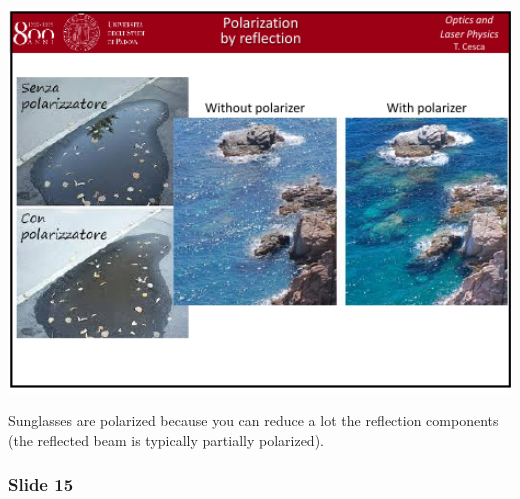 \documentclass[../main/main.tex]{subfiles}
\begin{document}
\begin{minipage}[]{0.5\linewidth}
\centering
\includegraphics[width=1\textwidth]{../lessons/pdf_file/02/02_S14.pdf}
\end{minipage}
\hspace{0.3cm}\vspace{0.3cm}
\begin{minipage}[c]{0.47\linewidth}
Sunglasses are polarized because you can reduce a lot the reflection components (the reflected beam is typically partially polarized).
\end{minipage}

\subsubsection*{Slide 15}
\end{document}
